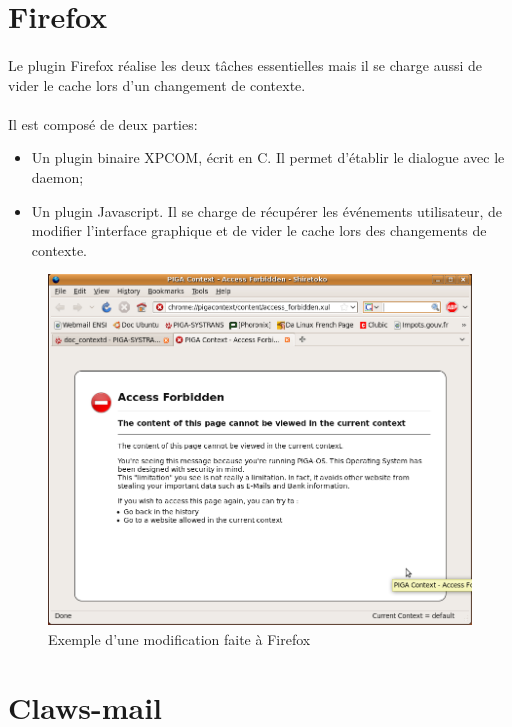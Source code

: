 	\section{Firefox}
		\paragraph*{}
			Le plugin Firefox réalise les deux tâches essentielles mais il se charge aussi de vider le cache lors d'un changement de contexte.
			
		\paragraph*{}
			Il est composé de deux parties:
			\begin{itemize}
   				\item Un plugin binaire XPCOM, écrit en C. Il permet d'établir le dialogue avec le daemon;
   				\item Un plugin Javascript. Il se charge de récupérer les événements utilisateur, de modifier l'interface graphique et de vider le cache lors des changements de contexte.
   			\end{itemize}
   			
   		\begin{figure}[!h]
			\includegraphics[width=13cm]{images/firefox.png}
			\caption{Exemple d'une modification faite à Firefox}
		\end{figure}
	
	\section{Claws-mail}
